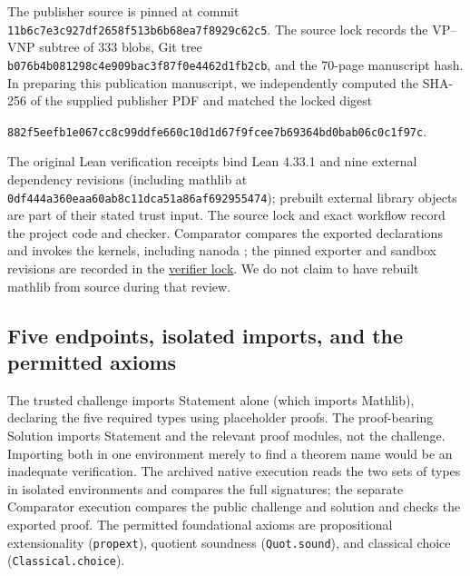 \documentclass[11pt,letterpaper]{article}
\theoremstyle{definition}\newtheorem{definition}[theorem]{Definition}\newtheorem{example}[theorem]{Example}
\theoremstyle{remark}\newtheorem{remark}[theorem]{Remark}
\newcommand{\follow}[2]{\href{https://github.com/nousentllc/VP-VNP-Review/blob/8a7976933b6b2b4ffda1ad3a0dfb5fc6b6f023e8/#1}{#2}}
\begin{document}
The publisher source is pinned at commit \nolinkurl{11b6c7e3c927df2658f513b6b68ea7f8929c62c5}. The source lock records the VP--VNP subtree of 333 blobs, Git tree \nolinkurl{b076b4b081298c4e909bac3f87f0e4462d1fb2cb}, and the 70-page manuscript hash. In preparing this publication manuscript, we independently computed the SHA-256 of the supplied publisher PDF and matched the locked digest
\begin{center}\small\nolinkurl{882f5eefb1e067cc8c99ddfe660c10d1d67f9fcee7b69364bd0bab06c0c1f97c}.\end{center}
The original Lean verification receipts bind Lean 4.33.1 \cite{lean4} and nine external dependency revisions (including mathlib \cite{mathlib} at \nolinkurl{0df444a360eaa60ab8c11dca51a86af692955474}); prebuilt external library objects are part of their stated trust input. The source lock and exact workflow record the project code and checker. Comparator \cite{comparator} compares the exported declarations and invokes the kernels, including nanoda \cite{nanoda}; the pinned exporter and sandbox revisions are recorded in the \follow{reproduce/versions.env}{verifier lock}. We do not claim to have rebuilt mathlib from source during that review.

\subsection{Five endpoints, isolated imports, and the permitted axioms}
The trusted challenge imports Statement alone (which imports Mathlib), declaring the five required types using placeholder proofs. The proof-bearing Solution imports Statement and the relevant proof modules, not the challenge. Importing both in one environment merely to find a theorem name would be an inadequate verification. The archived native execution reads the two sets of types in isolated environments and compares the full signatures; the separate Comparator execution compares the public challenge and solution and checks the exported proof. The permitted foundational axioms are propositional extensionality (\texttt{propext}), quotient soundness (\texttt{Quot.sound}), and classical choice (\texttt{Classical.choice}).
\end{document}
